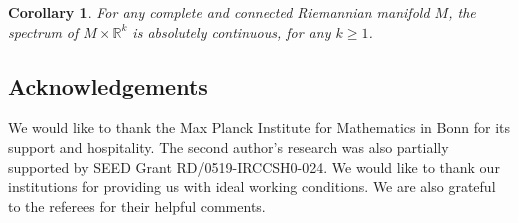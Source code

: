 \documentclass[10pt,a4paper]{amsart}
\numberwithin{equation}{section}
\newtheorem{Corollary}[Theorem]{Corollary}
\def\R{\mathbb R}
\begin{document}
\begin{Corollary}\label{eufac}
For any complete and connected Riemannian manifold $M$,
the spectrum of $M\times\R^k$ is absolutely continuous, for any $k\ge1$.
\end{Corollary}

\subsection*{Acknowledgements}

We would like to thank the Max Planck Institute for Mathematics in Bonn for its support and hospitality.
The second author’s research was also partially supported by SEED Grant RD/0519-IRCCSH0-024.
We would like to thank our institutions for providing us with ideal working conditions.
We are also grateful to the referees for their helpful comments.

\end{document}
